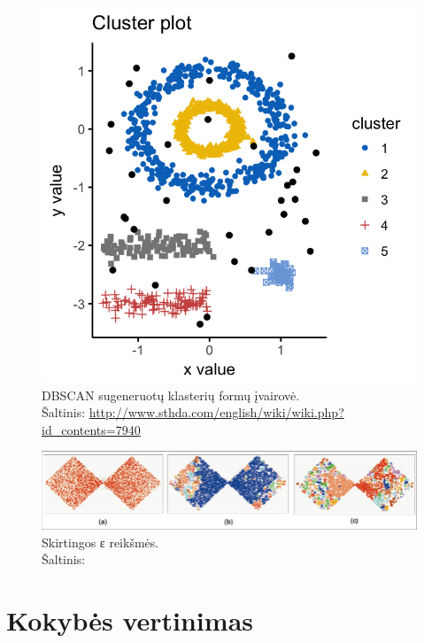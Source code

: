 \documentclass{VUMIFInfKursinis}
\begin{document}
\begin{figure}[H]
  \centering
  \includegraphics[scale=.3]{img/DBSCAN}
  \caption{DBSCAN sugeneruotų klasterių formų įvairovė.\\
           Šaltinis: \url{http://www.sthda.com/english/wiki/wiki.php?id_contents=7940}}
  \label{shapes}
  
\end{figure}

\begin{figure}[H]
  \centering
  \includegraphics[scale=1]{img/DBSCANprob}
  \caption{Skirtingos ε reikšmės.\\
           Šaltinis: \cite{karypis1999chameleon}}
  \label{sensitive}
\end{figure}










\section{Kokybės vertinimas}
\end{document}
